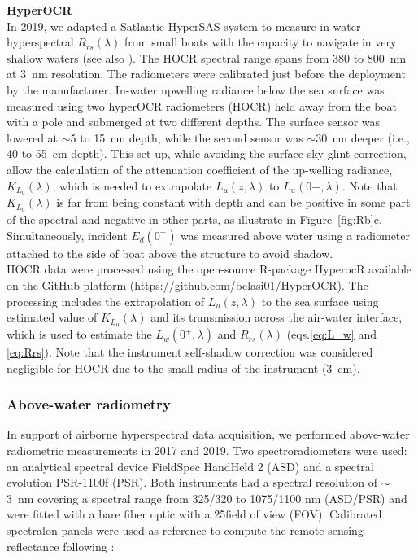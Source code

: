 \documentclass[essd, manuscript]{copernicus}
\begin{document}
\textbf{HyperOCR}\\
In 2019, we adapted a Satlantic HyperSAS system to measure in-water hyperspectral $R_{rs}(\lambda)$ from small boats with the capacity to navigate in very shallow waters (see also \citet{Mabit2022}). The HOCR spectral range spans from 380 to 800~nm at 3~nm resolution. The radiometers were calibrated just before the deployment by the manufacturer. In-water upwelling radiance below the sea surface was measured using two hyperOCR radiometers (HOCR) held away from the boat with a pole and submerged at two different depths. The surface sensor was lowered at $\sim$5 to 15~cm depth, while the second sensor was $\sim$30~cm deeper (i.e., 40 to 55~cm depth). This set up, while avoiding the surface sky glint correction, allow the calculation of the attenuation coefficient of the up-welling radiance, $K_{L_u}(\lambda)$, which is needed to extrapolate $L_u(z,\lambda)$ to  $L_u(0-,\lambda)$. Note that $K_{L_u}(\lambda)$ is far from being constant with depth and can be positive in some part of the spectral and negative in other parts, as illustrate in Figure~\ref{fig:Rb}c. Simultaneously, incident $E_d(0^+)$ was measured above water using a radiometer attached to the side of boat above the structure to avoid shadow.\\  

HOCR data were processed using the open-source R-package HyperocR available on the GitHub platform (\url{https://github.com/belasi01/HyperOCR}). The processing includes the extrapolation of $L_u(z,\lambda)$  to the sea surface using estimated value of $K_{L_u}(\lambda)$ and its transmission across the air-water interface, which is used to estimate the $L_w(0^+, \lambda)$  and $R_{rs}(\lambda)$ (eqs.\ref{eq:L_w} and \ref{eq:Rrs}). Note that the instrument self-shadow correction was considered negligible for HOCR due to the small radius of the instrument (3~cm).  

\subsubsection{Above-water radiometry}
In support of airborne hyperspectral data acquisition, we performed above-water radiometric measurements in 2017 and 2019. Two spectroradiometers were used: an analytical spectral device FieldSpec HandHeld 2 (ASD) and a spectral evolution PSR-1100f (PSR). Both instruments had a spectral resolution of $\sim$3~nm covering a spectral range from 325/320 to 1075/1100 nm (ASD/PSR) and were fitted with a bare fiber optic with a 25\degree field of view (FOV). Calibrated spectralon panels were used as reference to compute the remote sensing reflectance following \citet{Mobley1999}: 
\end{document}
